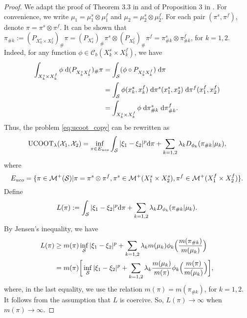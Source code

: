 \begin{proof}
  We adapt the proof of Theorem 3.3 in \citep{Liero18} and of Proposition 3 in \citep{Sejourne20}.
  For convenience, we write $\mu_1 = \mu_1^s \otimes \mu_1^f$ and
  $\mu_2 = \mu_2^s \otimes \mu_2^f$. For each pair $(\pi^s, \pi^f)$, denote
  $\pi = \pi^s \otimes \pi^f$.
  It can be shown that
  $\pi_{\# k} := (P_{X_k^s \times X_k^f})_{\#} \pi
  = (P_{X_k^s})_{\#} \pi^s \otimes (P_{X_k^f})_{\#} \pi^f =
  \pi^s_{\# k} \otimes \pi^f_{\# k}$, for $k=1,2$. Indeed, for any function
  $\phi \in \mathcal C_b(X_k^s \times X_k^f)$, we have
    \begin{equation}
      \begin{split}
        \int_{X_k^s \times X_k^f} \phi \;
        \mathrm d (P_{X_k^s X_k^f})_{\#} \pi
        &= \int_{\mathcal S} (\phi \circ P_{X_k^s X_k^f}) \; \mathrm d\pi \\
        &= \int_{\mathcal S} \phi(x_k^s, x_k^f)
        \; \mathrm d \pi^s(x_1^s, x_2^s) \; \mathrm d \pi^f(x_1^f, x_2^f) \\
        &= \int_{X_k^s \times X_k^f} \phi \; \mathrm d \pi^s_{\# k} \;
        \mathrm d \pi^f_{\# k}.
      \end{split}
    \end{equation}
  Thus, the problem \ref{eq:ucoot_copy} can be rewritten as
  \begin{equation}
    \text{UCOOT}_{\lambda}(\mathcal X_1, \mathcal X_2) =
    \inf_{\pi \in E_{uco}} \int_{\mathcal S} \vert \xi_1 - \xi_2 \vert^p
    \mathrm d\pi + \sum_{k=1,2} \lambda_k D_{\phi_k}(\pi_{\# k} \vert \mu_k),
  \end{equation}
  where
  \begin{equation}
    E_{uco} = \{ \pi \in \mathcal M^+(\mathcal S) \vert \pi = \pi^s \otimes \pi^f,
    \pi^s \in \mathcal M^+(X_1^s \times X_2^s),
    \pi^f \in \mathcal M^+(X_1^f \times X_2^f) \}.
  \end{equation}
  Define
  \begin{equation}
    L(\pi):= \int_{\mathcal S} \vert \xi_1 - \xi_2 \vert^p \mathrm d \pi +
    \sum_{k=1,2} \lambda_k D_{\phi_k}(\pi_{\# k} \vert \mu_k).
  \end{equation}
  By Jensen's inequality, we have
  \begin{equation}
    \begin{split}
      L(\pi) &\geq m(\pi) \inf_{\mathcal S} \vert \xi_1 - \xi_2 \vert^p +
      \sum_{k=1,2} \lambda_k m(\mu_k) \phi_k \Big( \frac{m(\pi_{\# k})}{m(\mu_k)} \Big) \\
      &= m(\pi) \bigg[ \inf_{\mathcal S} \vert \xi_1 - \xi_2 \vert^p +
      \sum_{k=1,2} \lambda_k \frac{m(\mu_k)}{m(\pi)} \phi_k
      \Big( \frac{m(\pi)}{m(\mu_k)} \Big) \bigg],
    \end{split}
  \end{equation}
  where, in the last equality, we use the relation $m(\pi) = m(\pi_{\# k})$, for $k=1,2$.
  It follows from the assumption that $L$ is coercive. So, $L(\pi) \to \infty$
  when $m(\pi) \to \infty$.


\end{proof}
